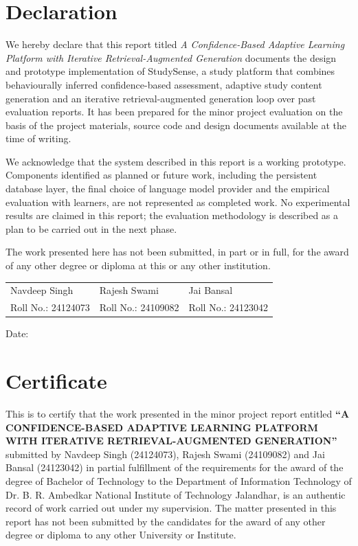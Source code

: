 \documentclass[12pt,a4paper,oneside]{report}
\begin{document}
\chapter*{Declaration}

We hereby declare that this report titled \emph{A Confidence-Based Adaptive
Learning Platform with Iterative Retrieval-Augmented Generation} documents
the design and prototype implementation of StudySense, a study platform that
combines behaviourally inferred confidence-based assessment, adaptive study content generation and an
iterative retrieval-augmented generation loop over past evaluation reports.
It has been prepared for the minor project evaluation on the basis of the
project materials, source code and design documents available at the time
of writing.

We acknowledge that the system described in this report is a working
prototype. Components identified as planned or future work, including the
persistent database layer, the final choice of language model provider and
the empirical evaluation with learners, are not represented as completed
work. No experimental results are claimed in this report; the evaluation
methodology is described as a plan to be carried out in the next phase.

The work presented here has not been submitted, in part or in full, for
the award of any other degree or diploma at this or any other institution.

\vspace{1.5cm}
\noindent
\begin{tabular}{@{}p{5cm}p{5cm}p{5cm}@{}}
Navdeep Singh & Rajesh Swami & Jai Bansal\\
Roll No.: 24124073 & Roll No.: 24109082 & Roll No.: 24123042\\
\end{tabular}

\vspace{1cm}
\noindent Date: \hrulefill\hspace*{8cm}

\clearpage

\chapter*{Certificate}

This is to certify that the work presented in the minor project report
entitled \textbf{``A CONFIDENCE-BASED ADAPTIVE LEARNING PLATFORM
WITH ITERATIVE RETRIEVAL-AUGMENTED GENERATION''} submitted by Navdeep Singh (24124073),
Rajesh Swami (24109082) and Jai Bansal (24123042) in partial fulfillment of
the requirements for the award of the degree of Bachelor of Technology to
the Department of Information Technology of Dr. B. R. Ambedkar National
Institute of Technology Jalandhar, is an authentic record of work carried
out under my supervision. The matter presented in this report has not been
submitted by the candidates for the award of any other degree or diploma to
any other University or Institute.
\end{document}
